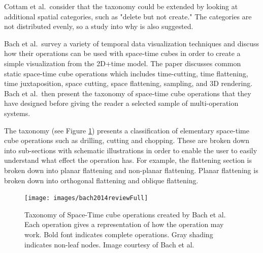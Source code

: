 Cottam et al.\ consider that the taxonomy could be extended by looking at additional spatial categories, such as "delete but not create." The categories are not distributed evenly, so a study into why is also suggested.


Bach et al.\ survey a variety of temporal data visualization techniques and discuss how their operations can be used with space-time cubes in order to create a simple  visualization from the 2D+time model. \cite{bach2014review}
The paper discusses common static space-time cube operations which includes time-cutting, time flattening, time juxtaposition, space cutting, space flattening, sampling, and 3D rendering. Bach et al.\ then present the taxonomy of space-time cube operations that they have designed before giving the reader a selected sample of multi-operation systems.

The taxonomy (see Figure \ref{fig: bach2014review}) presents a classification of elementary space-time cube operations such as drilling, cutting and chopping. These are broken down into sub-sections with schematic illustrations in order to enable the user to easily understand what effect the operation has. For example, the flattening section is broken down into planar flattening and non-planar flattening. Planar flattening is broken down into orthogonal flattening and oblique flattening.


\begin{figure}[p]
\begin{center}
\texttt{[image: images/bach2014reviewFull]}
\caption{Taxonomy of Space-Time cube operations created by Bach et al.\ \cite{bach2014review} Each operation gives a representation of how the operation may work. Bold font indicates complete operations. Gray shading indicates non-leaf nodes. Image courtesy of Bach et al.\ \cite{bach2014review}} \label{fig: bach2014review}
\end{center}
\end{figure}


